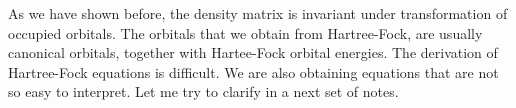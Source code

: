 \documentclass[a4paper, 12pt]{article}
\begin{document}
As we have shown before, the density matrix is invariant under transformation of occupied orbitals. The orbitals that we obtain from Hartree-Fock, are usually canonical orbitals, together with Hartee-Fock orbital energies. The derivation of Hartree-Fock equations is difficult. We are also obtaining equations that are not so easy to interpret. Let me try to clarify in a next set of notes.
	
\end{document}
